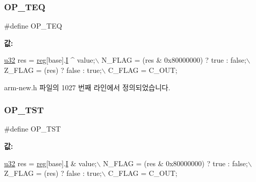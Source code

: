 \subsubsection{\texorpdfstring{O\+P\+\_\+\+T\+EQ}{OP\_TEQ}\hspace{0.1cm}{\footnotesize\ttfamily [2/2]}}
{\footnotesize\ttfamily \#define O\+P\+\_\+\+T\+EQ}

{\bfseries 값\+:}
\begin{DoxyCode}
\mbox{\hyperlink{_system_8h_a10e94b422ef0c20dcdec20d31a1f5049}{u32}} res = \mbox{\hyperlink{_g_b_a_8h_ae29faba89509024ffd1a292badcedf2d}{reg}}[base].\mbox{\hyperlink{unionreg__pair_a9f6a42d56c07829d7013571eda998252}{I}} ^ value;\(\backslash\)
      N\_FLAG = (res & 0x80000000) ? \textcolor{keyword}{true} : \textcolor{keyword}{false};\(\backslash\)
      Z\_FLAG = (res) ? \textcolor{keyword}{false} : \textcolor{keyword}{true};\(\backslash\)
      C\_FLAG = C\_OUT;
\end{DoxyCode}


arm-\/new.\+h 파일의 1027 번째 라인에서 정의되었습니다.

\mbox{\label{_g_b_a_8cpp_af2c62925bd9823c7837b97a0bf587e56}} 
\subsubsection{\texorpdfstring{O\+P\+\_\+\+T\+ST}{OP\_TST}\hspace{0.1cm}{\footnotesize\ttfamily [1/2]}}
{\footnotesize\ttfamily \#define O\+P\+\_\+\+T\+ST}

{\bfseries 값\+:}
\begin{DoxyCode}
\mbox{\hyperlink{_system_8h_a10e94b422ef0c20dcdec20d31a1f5049}{u32}} res = \mbox{\hyperlink{_g_b_a_8h_ae29faba89509024ffd1a292badcedf2d}{reg}}[base].\mbox{\hyperlink{unionreg__pair_a9f6a42d56c07829d7013571eda998252}{I}} & value;\(\backslash\)
      N\_FLAG = (res & 0x80000000) ? \textcolor{keyword}{true} : \textcolor{keyword}{false};\(\backslash\)
      Z\_FLAG = (res) ? \textcolor{keyword}{false} : \textcolor{keyword}{true};\(\backslash\)
      C\_FLAG = C\_OUT;
\end{DoxyCode}
\mbox{\label{arm-new_8h_af2c62925bd9823c7837b97a0bf587e56}} 
